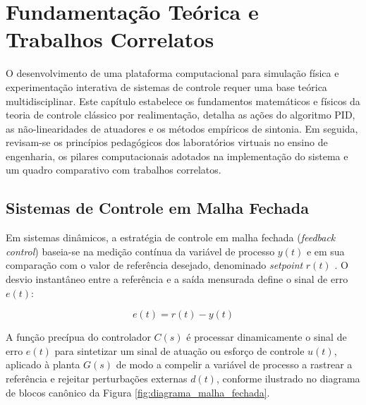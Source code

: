\chapter{Fundamentação Teórica e Trabalhos Correlatos}
\label{cap:fundamentacao}

O desenvolvimento de uma plataforma computacional para simulação física e experimentação interativa de sistemas de controle requer uma base teórica multidisciplinar. Este capítulo estabelece os fundamentos matemáticos e físicos da teoria de controle clássico por realimentação, detalha as ações do algoritmo PID, as não-linearidades de atuadores e os métodos empíricos de sintonia. Em seguida, revisam-se os princípios pedagógicos dos laboratórios virtuais no ensino de engenharia, os pilares computacionais adotados na implementação do sistema e um quadro comparativo com trabalhos correlatos.

\section{Sistemas de Controle em Malha Fechada}
\label{sec:controle_malha_fechada}

Em sistemas dinâmicos, a estratégia de controle em malha fechada (\textit{feedback control}) baseia-se na medição contínua da variável de processo $y(t)$ e em sua comparação com o valor de referência desejado, denominado \textit{setpoint} $r(t)$ \cite{ogata2010}. O desvio instantâneo entre a referência e a saída mensurada define o sinal de erro $e(t)$:

\begin{equation}
    e(t) = r(t) - y(t)
    \label{eq:sinal_erro}
\end{equation}

A função precípua do controlador $C(s)$ é processar dinamicamente o sinal de erro $e(t)$ para sintetizar um sinal de atuação ou esforço de controle $u(t)$, aplicado à planta $G(s)$ de modo a compelir a variável de processo a rastrear a referência e rejeitar perturbações externas $d(t)$, conforme ilustrado no diagrama de blocos canônico da Figura \ref{fig:diagrama_malha_fechada}.

